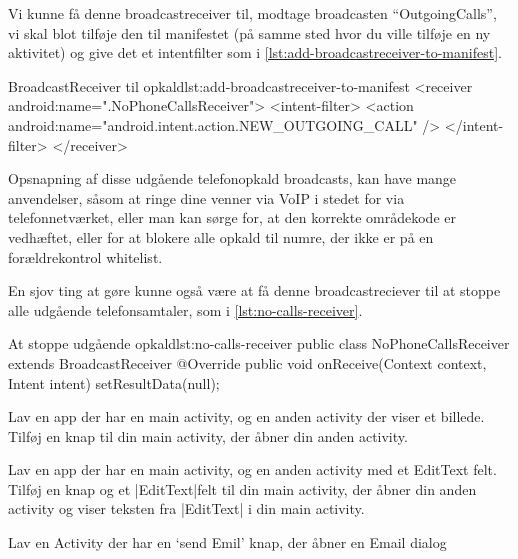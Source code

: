 Vi kunne få denne broadcastreceiver til, modtage broadcasten ``OutgoingCalls'', vi skal blot tilføje den til manifestet (på samme sted hvor du ville tilføje en ny aktivitet) og give det et intentfilter som i \autoref{lst:add-broadcastreceiver-to-manifest}.

\begin{example}\noindent
	\begin{XmlCode}{BroadcastReceiver til opkald}{lst:add-broadcastreceiver-to-manifest}
		<receiver android:name=".NoPhoneCallsReceiver">
			<intent-filter>
				<action android:name="android.intent.action.NEW_OUTGOING_CALL" />
			</intent-filter>
		</receiver>
	\end{XmlCode}
\end{example}

Opsnapning af disse udgående telefonopkald broadcasts, kan have mange anvendelser, såsom at ringe dine venner via VoIP i stedet for via telefonnetværket, eller man kan sørge for, at den korrekte områdekode er vedhæftet, eller for at blokere alle opkald til numre, der ikke er på en forældrekontrol whitelist.

En sjov ting at gøre kunne også være at få denne broadcastreciever til at stoppe alle udgående telefonsamtaler, som i \autoref{lst:no-calls-receiver}.

\begin{example}\noindent
	\begin{JavaCode}{At stoppe udgående opkald}{lst:no-calls-receiver}
		public class NoPhoneCallsReceiver extends BroadcastReceiver {
			@Override
			public void onReceive(Context context, Intent intent) {
				setResultData(null);
			}
		}
	\end{JavaCode}
\end{example}

\begin{exercise}
	Lav en app der har en main activity, og en anden activity der viser et billede. Tilføj en knap til din main activity, der åbner din anden activity.
\end{exercise}

\begin{exercise}
	Lav en app der har en main activity, og en anden activity med et EditText felt. Tilføj en knap og et \JavaInline|EditText|felt til din main activity, der åbner din anden activity og viser teksten fra \JavaInline|EditText| i din main activity.
\end{exercise}

\begin{exercise}
	Lav en Activity der har en ‘send Emil’ knap, der åbner en Email dialog
\end{exercise}

